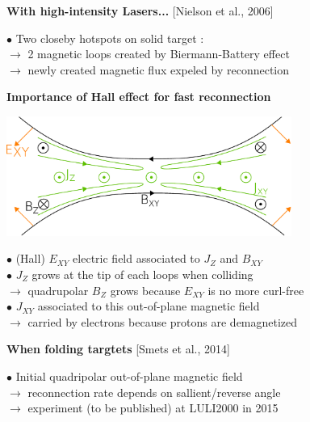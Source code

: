 \documentclass[landscape]{slides}
\begin{document}
\begin{slide}
\large{\textbf{With high-intensity Lasers...} [Nielson et al., 2006]}



$\bullet$ Two closeby hotspots on solid target :\\
$\rightarrow$ 2 magnetic loops created by Biermann-Battery effect\\
$\rightarrow$ newly created magnetic flux expeled by reconnection

\end{slide}

\begin{slide}
\large{\textbf{Importance of Hall effect for fast reconnection}}

\begin{center}
\includegraphics[width=0.7\textwidth]{scheme.jpg}
\end{center}

$\bullet$ (Hall) $E_{XY}$ electric field associated to $J_Z$ and $B_{XY}$\\
$\bullet$ $J_Z$ grows at the tip of each loops when colliding\\
$\rightarrow$ quadrupolar $B_Z$ grows because $E_{XY}$ is no more curl-free\\
$\bullet$ $J_{XY}$ associated to this out-of-plane magnetic field\\
$\rightarrow$ carried by electrons because protons are demagnetized

\end{slide}

\begin{slide}
\large{\textbf{When folding targtets} [Smets et al., 2014]}



$\bullet$ Initial quadripolar out-of-plane magnetic field\\
$\rightarrow$ reconnection rate depends on sallient/reverse angle\\
$\rightarrow$ experiment (to be published) at LULI2000 in 2015

\end{slide}
\end{document}
